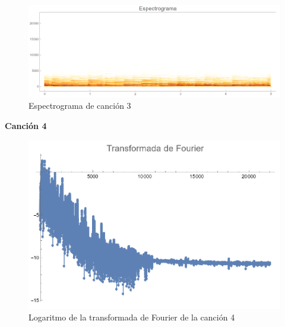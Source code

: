 \documentclass[12pt, letterpaper]{article}
\begin{document}
\begin{figure}[H]
  \centering
  \includegraphics[width=.9\linewidth]{imgs/Cancion3/espectrograma.png}
  \caption{Espectrograma de canción 3}
  \label{fig:03i}
\end{figure}

\textbf{\large{Canción 4}}
\begin{figure}[H]
  \centering
  \includegraphics[width=0.7\linewidth]{imgs/Cancion4/transformada.png}
  \caption{Logaritmo de la transformada de Fourier de la canción 4}
  \label{fig:04a}
\end{figure}
\end{document}
